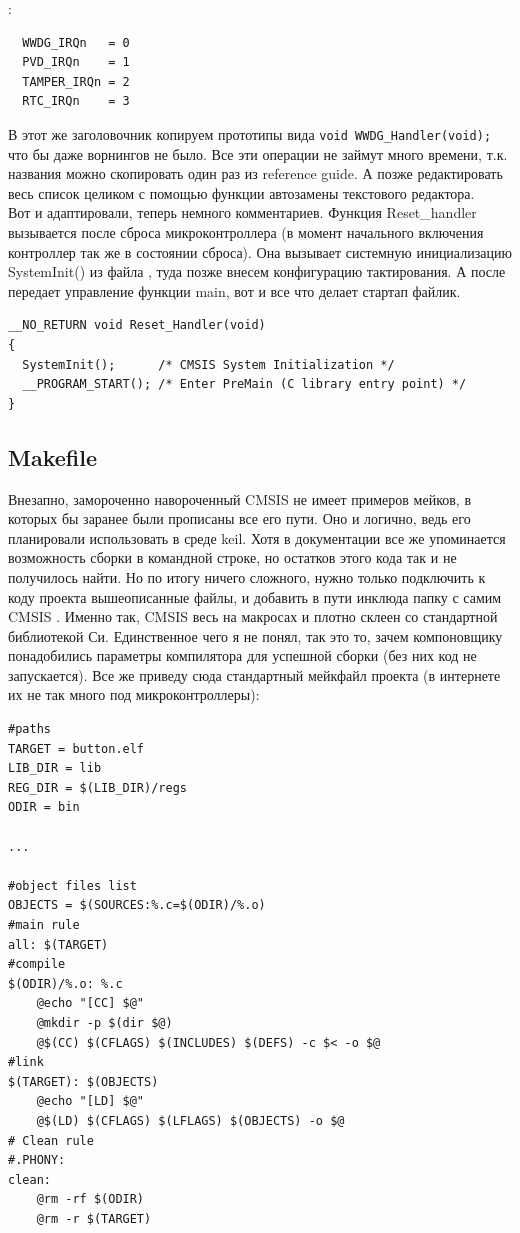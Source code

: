 \documentclass[12pt,a4paper]{article}
\begin{document}
:
\begin{lstlisting}
  WWDG_IRQn   = 0
  PVD_IRQn    = 1
  TAMPER_IRQn = 2
  RTC_IRQn    = 3
\end{lstlisting}
    В этот же заголовочник копируем прототипы вида
    \lstinline{void WWDG_Handler(void);} что бы даже ворнингов не было.
    Все эти операции не займут много времени, т.к. названия можно скопировать
    один раз из reference guide. А позже редактировать весь список целиком
    с помощью функции автозамены текстового редактора.\\
    Вот и адаптировали, теперь немного комментариев. Функция Reset\_handler
    вызывается после сброса микроконтроллера (в момент начального включения
    контроллер так же в состоянии сброса). Она вызывает системную инициализацию
    SystemInit() из файла
    , туда позже внесем конфигурацию тактирования. А после
    передает управление функции main, вот и все что делает стартап файлик.
\begin{lstlisting}
__NO_RETURN void Reset_Handler(void)
{
  SystemInit();      /* CMSIS System Initialization */
  __PROGRAM_START(); /* Enter PreMain (C library entry point) */
}
\end{lstlisting}

\subsection{Makefile}
    Внезапно, замороченно навороченный CMSIS не имеет примеров мейков, в
    которых бы заранее были прописаны все его пути. Оно и логично, ведь его
    планировали использовать в среде keil. Хотя в документации все же
    упоминается возможность сборки в командной строке, но остатков этого кода
    так и не получилось найти. Но по итогу ничего сложного, нужно только
    подключить к коду проекта вышеописанные файлы, и добавить в пути инклюда
    папку с самим CMSIS . Именно так, CMSIS
    весь на макросах и плотно склеен со стандартной библиотекой Си. Единственное
    чего я не понял, так это то, зачем компоновщику понадобились параметры
    компилятора для успешной сборки (без них код не запускается). Все же приведу
    сюда стандартный мейкфайл проекта (в интернете их не так много под
    микроконтроллеры):
\begin{lstlisting}
#paths
TARGET = button.elf
LIB_DIR = lib
REG_DIR	= $(LIB_DIR)/regs
ODIR = bin

...

#object files list
OBJECTS = $(SOURCES:%.c=$(ODIR)/%.o)
#main rule
all: $(TARGET)
#compile
$(ODIR)/%.o: %.c
	@echo "[CC] $@"
	@mkdir -p $(dir $@)
	@$(CC) $(CFLAGS) $(INCLUDES) $(DEFS) -c $< -o $@
#link
$(TARGET): $(OBJECTS)
	@echo "[LD] $@"
	@$(LD) $(CFLAGS) $(LFLAGS) $(OBJECTS) -o $@
# Clean rule
#.PHONY:
clean:
	@rm -rf $(ODIR)
	@rm -r $(TARGET)
\end{lstlisting}
\end{document}
